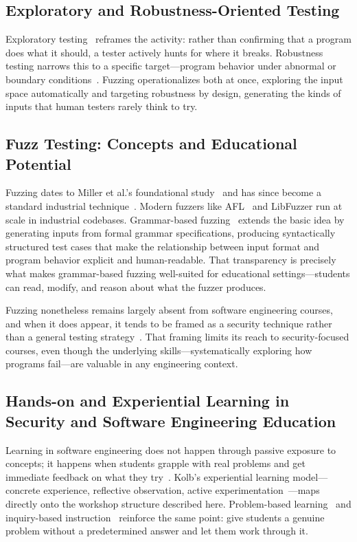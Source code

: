 \documentclass[conference]{IEEEtran}
\begin{document}
\subsection{Exploratory and Robustness-Oriented Testing}

Exploratory testing~\cite{whittaker2009exploratory} reframes the activity: rather than confirming that a program does what it should, a tester actively hunts for where it breaks.
Robustness testing narrows this to a specific target---program behavior under abnormal or boundary conditions~\cite{manes2019art}.
Fuzzing operationalizes both at once, exploring the input space automatically and targeting robustness by design, generating the kinds of inputs that human testers rarely think to try.

\subsection{Fuzz Testing: Concepts and Educational Potential}

Fuzzing dates to Miller et al.'s foundational study~\cite{miller1990empirical} and has since become a standard industrial technique~\cite{klees2018evaluating}.
Modern fuzzers like AFL~\cite{afl2021} and LibFuzzer run at scale in industrial codebases.
Grammar-based fuzzing~\cite{aschermann2019nautilus, zeller2019fuzzing} extends the basic idea by generating inputs from formal grammar specifications, producing syntactically structured test cases that make the relationship between input format and program behavior explicit and human-readable.
That transparency is precisely what makes grammar-based fuzzing well-suited for educational settings---students can read, modify, and reason about what the fuzzer produces.

Fuzzing nonetheless remains largely absent from software engineering courses, and when it does appear, it tends to be framed as a security technique rather than a general testing strategy~\cite{klees2018evaluating}.
That framing limits its reach to security-focused courses, even though the underlying skills---systematically exploring how programs fail---are valuable in any engineering context.

\subsection{Hands-on and Experiential Learning in Security and Software Engineering Education}

Learning in software engineering does not happen through passive exposure to concepts; it happens when students grapple with real problems and get immediate feedback on what they try~\cite{kolb1984experiential}.
Kolb's experiential learning model---concrete experience, reflective observation, active experimentation~\cite{kolb1984experiential}---maps directly onto the workshop structure described here.
Problem-based learning~\cite{hmelo2004problem} and inquiry-based instruction~\cite{prince2004active} reinforce the same point: give students a genuine problem without a predetermined answer and let them work through it.
\end{document}
